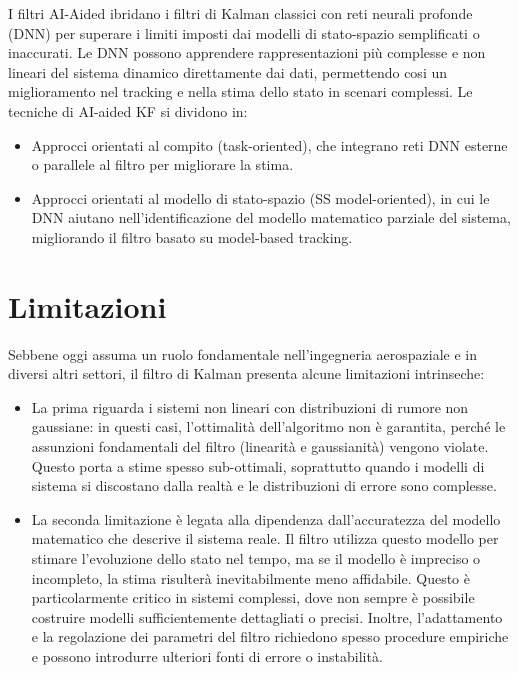 \documentclass[12pt,a4paper,openright,twoside]{book}
\begin{document}
I filtri AI-Aided ibridano i filtri di Kalman classici con reti neurali profonde (DNN) per superare i limiti imposti dai modelli di stato-spazio semplificati o inaccurati. Le DNN possono apprendere rappresentazioni più complesse e non lineari del sistema dinamico direttamente dai dati, permettendo cosi un miglioramento nel tracking e nella stima dello stato in scenari complessi. Le tecniche di AI-aided KF si dividono in:
\begin{itemize}
\item Approcci orientati al compito (task-oriented), che integrano reti DNN esterne o parallele al filtro per migliorare la stima.
\item Approcci orientati al modello di stato-spazio (SS model-oriented), in cui le DNN aiutano nell'identificazione del modello matematico parziale del sistema, migliorando il filtro basato su model-based tracking.
\end{itemize}

\section{Limitazioni}

Sebbene oggi assuma un ruolo fondamentale nell'ingegneria aerospaziale e in diversi altri settori, il filtro di Kalman presenta alcune limitazioni intrinseche:
\begin{itemize}
\item La prima riguarda i sistemi non lineari con distribuzioni di rumore non gaussiane: in questi casi, l'ottimalità dell'algoritmo non è garantita, perché le assunzioni fondamentali del filtro (linearità e gaussianità) vengono violate. Questo porta a stime spesso sub-ottimali, soprattutto quando i modelli di sistema si discostano dalla realtà e le distribuzioni di errore sono complesse.
\item La seconda limitazione è legata alla dipendenza dall'accuratezza del modello matematico che descrive il sistema reale. Il filtro utilizza questo modello per stimare l'evoluzione dello stato nel tempo, ma se il modello è impreciso o incompleto, la stima risulterà inevitabilmente meno affidabile. Questo è particolarmente critico in sistemi complessi, dove non sempre è possibile costruire modelli sufficientemente dettagliati o precisi. Inoltre, l'adattamento e la regolazione dei parametri del filtro richiedono spesso procedure empiriche e possono introdurre ulteriori fonti di errore o instabilità.
\end{itemize}
\end{document}
